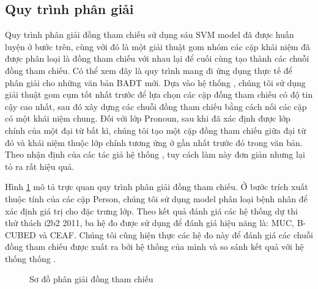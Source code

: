\subsection*{Quy trình phân giải}
Quy trình phân giải đồng tham chiếu sử dụng sáu SVM model đã được huấn luyện ở bước trên, cùng với đó là một giải thuật gom nhóm các cặp khái niệm đã được phân loại là đồng tham chiếu với nhau lại để cuối cùng tạo thành các chuỗi đồng tham chiếu. Có thể xem đây là quy trình mang đi ứng dụng thực tế để phân giải cho những văn bản BAĐT mới. Dựa vào hệ thống \cite{YanXu2012}, chúng tôi sử dụng giải thuật gom cụm tốt nhất trước để lựa chọn các cặp đồng tham chiếu có độ tin cậy cao nhất, sau đó xây dựng các chuỗi đồng tham chiếu bằng cách nối các cặp có một khái niệm chung. Đối với lớp Pronoun, sau khi đã xác định được lớp chính của một đại từ bất kì, chúng tôi tạo một cặp đồng tham chiếu giữa đại từ đó và khái niệm thuộc lớp chính tương ứng ở gần nhất trước đó trong văn bản. Theo nhận định của các tác giả hệ thống \cite{YanXu2012}, tuy cách làm này đơn giản nhưng lại tỏ ra rất hiệu quả.

Hình \ref{fig:SDPG} mô tả trực quan quy trình phân giải đồng tham chiếu. Ở bước trích xuất thuộc tính của các cặp Person, chúng tôi sử dụng model phân loại bệnh nhân để xác định giá trị cho đặc trưng lớp. Theo kết quả đánh giá các hệ thống dự thi thử thách i2b2 2011, ba hệ đo được sử dụng để đánh giá hiệu năng là: MUC, B-CUBED và CEAF. Chúng tôi cũng hiện thực các hệ đo này để đánh giá các chuỗi đồng tham chiếu được xuất ra bởi hệ thống của mình và so sánh kết quả với hệ thống thống \cite{YanXu2012}.

\begin{figure}[th]
\centering
{}
\caption{Sơ đồ phân giải đồng tham chiếu\label{fig:SDPG}}
\end{figure}

